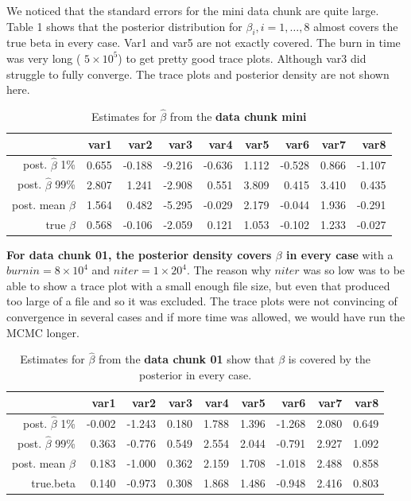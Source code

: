 \documentclass[11pt]{amsart}
\begin{document}
We noticed that the standard errors for the mini data chunk are quite large. Table 1 shows that the posterior distribution for  $\beta_i, i = 1, \dots, 8$ almost covers the true beta in every case. Var1 and var5 are not exactly covered. The burn in time was very long ( $5 \times 10^5$) to get pretty good trace plots. Although var3 did struggle to fully converge. The trace plots and posterior density are not shown here. 
\begin{table}[ht]
\caption{Estimates for $\hat{\beta}$ from the { \bf data chunk mini }}
\centering
\begin{tabular}{rrrrrrrrr}
  \hline
 & var1 & var2 & var3 & var4 & var5 & var6 & var7 & var8 \\ 
  \hline
post.  $\hat{\beta}$ 1\% & 0.655 & -0.188 & -9.216 & -0.636 & 1.112 & -0.528 & 0.866 & -1.107 \\ 
post.  $\hat{\beta}$ 99\% & 2.807 & 1.241 & -2.908 & 0.551 & 3.809 & 0.415 & 3.410 & 0.435 \\ 
  post. mean $\hat{\beta}$ & 1.564 & 0.482 & -5.295 & -0.029 & 2.179 & -0.044 & 1.936 & -0.291 \\ 
  true $\beta$& 0.568 & -0.106 & -2.059 & 0.121 & 1.053 & -0.102 & 1.233 & -0.027 \\ 
   \hline
\end{tabular}
\end{table}

{ \bf For data chunk 01, the posterior density covers $\beta$ in every case } with a $burnin = 8 \times 10^4$ and $niter  =  1 \times 20^4$.  The reason why $niter$ was so low was to be able to show a trace plot with a small enough file size, but even that produced too large of a file and so it was excluded. The trace plots were not convincing of convergence in several cases and if more time was allowed, we would have run the MCMC longer. 

\begin{table}[ht]
\caption{Estimates for $\hat{\beta}$ from the {\bf data chunk 01 } show that $\beta$ is covered by the posterior in every case.}
\centering
\begin{tabular}{rrrrrrrrr}
  \hline
 & var1 & var2 & var3 & var4 & var5 & var6 & var7 & var8 \\ 
  \hline
post.  $\hat{\beta}$ 1\% & -0.002 & -1.243 & 0.180 & 1.788 & 1.396 & -1.268 & 2.080 & 0.649 \\ 
  post.  $\hat{\beta}$ 99\% & 0.363 & -0.776 & 0.549 & 2.554 & 2.044 & -0.791 & 2.927 & 1.092 \\ 
  post.  mean $\hat{\beta}$ & 0.183 & -1.000 & 0.362 & 2.159 & 1.708 & -1.018 & 2.488 & 0.858 \\ 
  true.beta & 0.140 & -0.973 & 0.308 & 1.868 & 1.486 & -0.948 & 2.416 & 0.803 \\ 
   \hline
\end{tabular}
\end{table}
\end{document}
